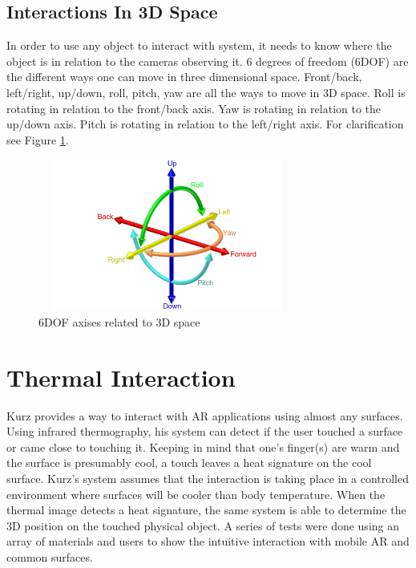 \documentclass{sig-alternate}
\begin{document}
\subsection{Interactions In 3D Space}
\label{sec:6DOF}
In order to use any object to interact with system, it needs to know where the object is in relation to the cameras observing it. 6 degrees of freedom (6DOF) are the different ways one can move in three dimensional space. Front/back, left/right, up/down, roll, pitch, yaw are all the ways to move in 3D space. Roll is rotating in relation to the front/back axis. Yaw is rotating in relation to the up/down axis. Pitch is rotating in relation to the left/right axis. For clarification see Figure \ref{fig:6DOF}.

\begin{figure}
	\includegraphics[width=8.5cm, height=5cm]{6DOF_en}
	\caption{6DOF axises related to 3D space \cite{6DOF}}
	\label{fig:6DOF}
\end{figure}  




\section{Thermal Interaction}
\label{sec:Thermal Interaction}
Kurz \cite{Thermal} provides a way to interact with AR applications using almost any surfaces. Using infrared thermography, his system can detect if the user touched a surface or came close to touching it. Keeping in mind that one's finger(s) are warm and the surface is presumably cool, a touch leaves a heat signature on the cool surface. Kurz's system assumes that the interaction is taking place in a controlled environment where surfaces will be cooler than body temperature. When the thermal image detects a heat signature, the same system is able to determine the 3D position on the touched physical object. A series of tests were done using an array of materials and users to show the intuitive interaction with mobile AR and common surfaces. 
\end{document}
